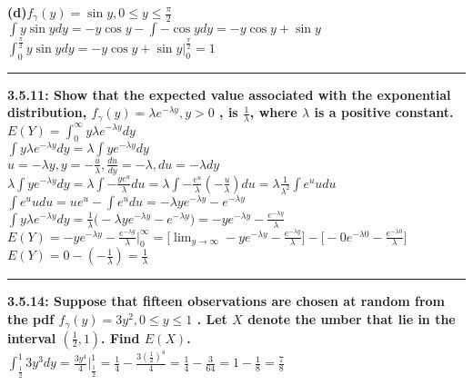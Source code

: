 \documentclass[11pt]{article}
\newcommand\question[2]{\vspace{.25in}\hrule\textbf{#1: #2}\vspace{.5em}\vspace{.10in}}
\renewcommand\part[1]{\vspace{.10in}\textbf{(#1)}}
\begin{document}
\part{d}$f_{\gamma} (y) = \sin y, 0 \leq y \leq \frac{\pi}{2}$
\\
$
\int y \sin y dy 
= 
-y\cos y - \int - \cos y dy
=
-y \cos y + \sin y
$
\\
$
\int_{0}^{\frac{\pi}{2}} y \sin y dy 
=
-y \cos y + \sin y \Big|_{0}^{\frac{\pi}{2}}
=
1
$


\question{3.5.11}
{Show that the expected value associated with the exponential distribution,
$f_{\gamma} (y) = \lambda e^{- \lambda y},y > 0$
, is $\frac{1}{\lambda}$, where $\lambda$ is a positive constant.}
\\
$
E(Y) = \int_{0}^{\infty} y \lambda e^{- \lambda y} dy
$
\\
$
\int y \lambda e^{ - \lambda y} dy 
= 
\lambda \int y e^{- \lambda y} dy
$
\\
$
u = - \lambda y, y = -\frac{u}{\lambda},\frac{du}{dy} = - \lambda, du = - \lambda dy
$
\\
$
\lambda \int y e^{- \lambda y} dy 
= 
\lambda \int -\frac{y e^{u}}{\lambda}du
=
\lambda \int -\frac{e^{u}}{\lambda}(-\frac{u}{\lambda})du
=
\lambda \frac{1}{\lambda^{2}} \int e^{u}udu
$
\\
$
\int e^{u}udu = ue^{u} - \int e^{u}du
=
- \lambda y e^{- \lambda y} - e^{- \lambda y}
$
\\
$
\int y \lambda e^{ - \lambda y} dy 
=
\frac{1}{\lambda} \Big(- \lambda y e^{- \lambda y} - e^{- \lambda y}\Big)
=
-ye^{ - \lambda y} - \frac{e^{- \lambda y}}{\lambda}
$
\\
$
E(Y)
=
-ye^{ - \lambda y} - \frac{e^{- \lambda y}}{\lambda} \Big |_{0}^{\infty}
=
\Big[\lim_{y\to\infty} 
-ye^{ - \lambda y} - \frac{e^{- \lambda y}}{\lambda} \Big]
-
\Big[
    -0e^{ - \lambda 0} - \frac{e^{- \lambda 0}}{\lambda}
\Big]
$
\\
$
E(Y) = 0 - (-\frac{1}{\lambda}) = \frac{1}{\lambda}
$



\question{3.5.14}
{Suppose that fifteen observations are chosen at random from the pdf 
$f_{\gamma} (y) = 3y^{2}, 0 \leq y \leq 1$
. Let $X$ denote the umber that lie in the interval 
$(\frac{1}{2}, 1)$. Find $E(X)$.}
\\
$
\int_{\frac{1}{2}}^{1} 3 y^{3} dy 
=
\frac{3y^{4}}{4} \big |_{\frac{1}{2}}^{1}
=
\frac{1}{4} - \frac{3(\frac{1}{2})^{4}}{4}
=
\frac{1}{4} - \frac{3}{64}
=
1 - \frac{1}{8}
=
\frac{7}{8}
$
\end{document}
